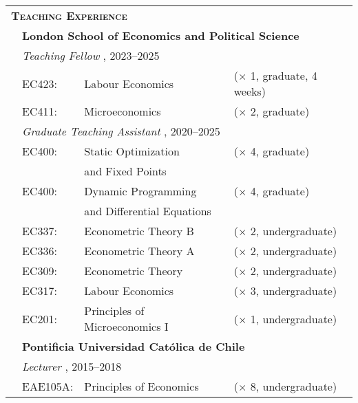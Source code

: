 \begin{tabular}{llll}
	
	\multicolumn{3}{l}{
		\large
		\textbf{%
			\textsc{%
				Teaching Experience
			}
		}
	}
	\\[2ex]
	
	\indent
	&
	\multicolumn{3}{l}{
		\textbf{%
			London School of Economics and Political Science
		}
	}
	\\[1ex]
	
	&
	\multicolumn{3}{l}{
		\textit{%
			Teaching Fellow%
		}%
		,
		2023--2025
	}
	\\[.5ex]
	
	& EC423:
	& Labour Economics
	& ($\times$ 1, graduate, 4 weeks)
	\\
	
	& EC411:
	& Microeconomics
	& ($\times$ 2, graduate)
	\\[1.2ex]
	
	&
	\multicolumn{3}{l}{
		\textit{%
			Graduate Teaching Assistant%
		}%
		,
		2020--2025
	}
	\\[.5ex]
	
	& EC400:
	& Static Optimization
	& ($\times$ 4, graduate)
	\\
	
	& 
	& and Fixed Points
	& 
	\\
	
	& EC400:
	& Dynamic Programming
	& ($\times$ 4, graduate)
	\\
	& 
	& and Differential Equations
	& 
	\\
	
	& EC337:
	& Econometric Theory B
	& ($\times$ 2, undergraduate)
	\\%
	
	& EC336:
	& Econometric Theory A
	& ($\times$ 2, undergraduate)
	\\%
	
	& EC309:
	& Econometric Theory
	& ($\times$ 2, undergraduate)
	\\%
	
	& EC317:
	& Labour Economics
	& ($\times$ 3, undergraduate)
	\\%
	
	& EC201:
	& Principles of Microeconomics I
	& ($\times$ 1, undergraduate)
	\\[2ex]
	
	&
	\multicolumn{3}{l}{
		\textbf{%
			Pontificia Universidad Cat\'olica de Chile
		}
	}
	\\[1ex]
	
	&
	\multicolumn{3}{l}{
		\textit{%
			Lecturer%
		}%
		,
		2015--2018
	}
	\\[.5ex]
	
	& EAE105A:
	& Principles of Economics
	& ($\times$ 8, undergraduate)

\end{tabular}


